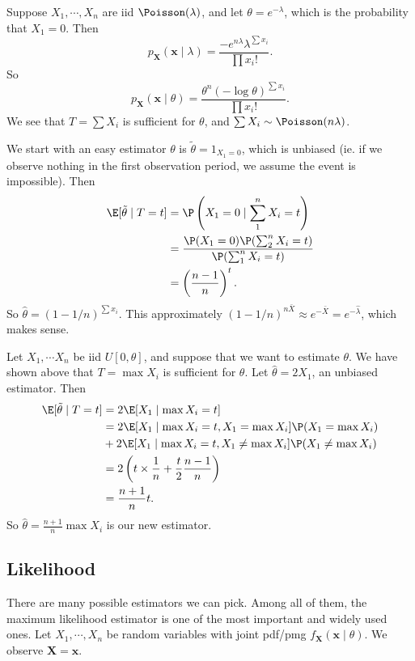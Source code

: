 \documentclass[a4paper]{article}
\begin{document}
\begin{eg}
  Suppose $X_1, \cdots, X_n$ are iid $\Poisson(\lambda)$, and let $\theta = e^{-\lambda}$, which is the probability that $X_1 = 0$. Then
  \[
    p_\mathbf{X}(\mathbf{x}\mid \lambda) =\frac{-e^{n\lambda}\lambda^{\sum x_i}}{\prod x_i!}.
  \]
  So
  \[
    p_\mathbf{X}(\mathbf{x}\mid \theta) = \frac{\theta^n(-\log \theta)^{\sum x_i}}{\prod x_i!}.
  \]
  We see that $T = \sum X_i$ is sufficient for $\theta$, and $\sum X_i \sim \Poisson (n\lambda)$.

  We start with an easy estimator $\theta$ is $\tilde{\theta} = 1_{X_1 = 0}$, which is unbiased (ie. if we observe nothing in the first observation period, we assume the event is impossible). Then
  \begin{align*}
    \E[\tilde{\theta}\mid T = t] &= \P\left(X_1 = 0\mid \sum_1^n X_i = t\right)\\
    &= \frac{\P(X_1 = 0)\P(\sum_2^n X_i = t)}{\P(\sum_1^n X_i = t)}\\
    &= \left(\frac{n - 1}{n}\right)^t.
  \end{align*}
  So $\hat{\theta} = (1 - 1/n)^{\sum x_i}$. This approximately $(1 - 1/n)^{n\bar{X}} \approx e^{-\bar X} = e^{-\hat{\lambda}}$, which makes sense.
\end{eg}

\begin{eg}
  Let $X_1, \cdots X_n$ be iid $U[0, \theta]$, and suppose that we want to estimate $\theta$. We have shown above that $T = \max X_i$ is sufficient for $\theta$. Let $\hat{\theta} = 2X_1$, an unbiased estimator. Then
  \begin{align*}
    \E[\tilde{\theta}\mid T = t] &= 2\E[X_1\mid \max X_i = t]\\
    &= 2\E[X_1\mid \max X_i = t, X_1 = \max X_i]\P(X_1 = \max X_i)\\
    &+ 2\E[X_1\mid \max X_i = t, X_1 \not= \max X_i] \P(X_1 \not= \max X_i)\\
    &= 2\left(t\times \frac{1}{n} + \frac{t}{2}\frac{n - 1}{n}\right)\\
    &= \frac{n + 1}{n}t.
  \end{align*}
  So $\hat{\theta} = \frac{n + 1}{n}\max X_i$ is our new estimator.
\end{eg}

\subsection{Likelihood}
There are many possible estimators we can pick. Among all of them, the maximum likelihood estimator is one of the most important and widely used ones. Let $X_1, \cdots , X_n$ be random variables with joint pdf/pmg $f_\mathbf{X}(\mathbf{x}\mid \theta)$. We observe $\mathbf{X} = \mathbf{x}$.
\end{document}
